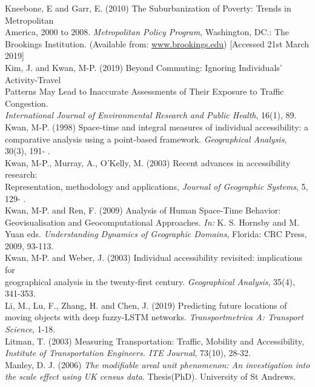 \documentclass[a4paper,UKenglish]{lipics-v2018}
\begin{document}
Kneebone, E and Garr, E. (2010) The Suburbanization of Poverty: Trends in Metropolitan \\
\indent America, 2000 to 2008. \textit{Metropolitan Policy Program}, Washington, DC.: The Brookings 
\indent Institution. (Available from: \href{https://www.brookings.edu/research/the-suburbanization-of-poverty-trends-in-metropolitan-america-2000-to-2008/}{www.brookings.edu}) [Accessed 21st March 2019]\\
Kim, J. and Kwan, M-P. (2019) Beyond Commuting: Ignoring Individuals’ Activity-Travel \\
\indent Patterns May Lead to Inaccurate Assessments of Their Exposure to Traffic Congestion. \\ 
\indent \textit{International Journal of Environmental Research and Public Health}, 16(1), 89. \\
Kwan, M-P. (1998) Space‐time and integral measures of individual accessibility: a \\
\indent comparative analysis using a point‐based framework. \textit{Geographical Analysis}, 30(3), 191-
. \\
Kwan, M-P., Murray, A., O'Kelly, M. (2003) Recent advances in accessibility research: \\
\indent Representation, methodology and applications, \textit{Journal of Geographic Systems}, 5, 129-
. \\
Kwan, M-P. and Ren, F. (2009) Analysis of Human Space-Time Behavior: Geovisualisation 
\indent and Geocomputational Approaches. \textit{In:} K. S. Hornsby and M. Yuan eds. \textit{Understanding 
\indent Dynamics of Geographic Domains}, Florida: CRC Press, 2009, 93-113. \\
Kwan, M-P. and Weber, J. (2003) Individual accessibility revisited: implications for \\
\indent geographical analysis in the twenty‐first century. \textit{Geographical Analysis}, 35(4), 341-353. \\
Li, M., Lu, F., Zhang, H. and Chen, J. (2019) Predicting future locations of moving objects \indent with deep fuzzy-LSTM networks. \textit{Transportmetrica A: Transport Science}, 1-18. \\
Litman, T. (2003) Measuring Transportation: Traffic, Mobility and Accessibility, \textit{Institute
\indent of Transportation Engineers. ITE Journal}, 73(10), 28-32. \\
Manley, D. J. (2006) \textit{The modifiable areal unit phenomenon: An investigation into the scale 
\indent effect using UK census data}. Thesis(PhD). University of St Andrews. \\
\end{document}

